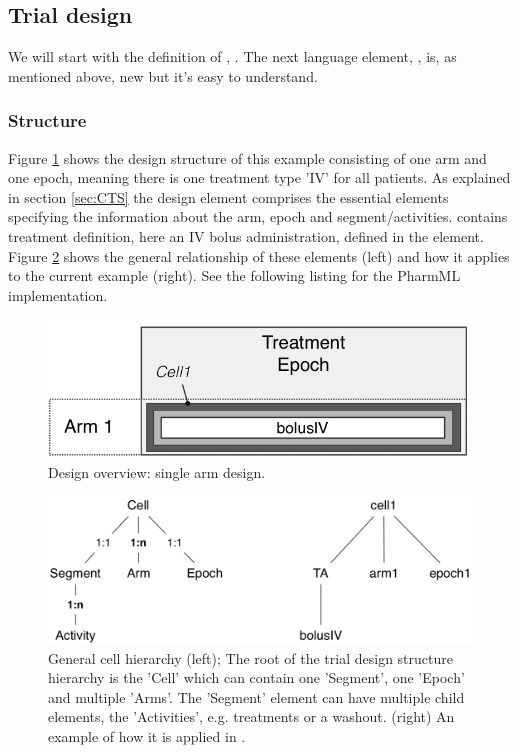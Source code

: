 \subsection{Trial design}
We will start with the definition of , . The next language element, , is, as mentioned above, new but it's easy to understand.

\subsubsection{Structure}
Figure \ref{fig:1Arm1Epoch_RibbaDesign} shows the design structure of this example 
consisting of one arm and one epoch, meaning there is one treatment type 'IV' for all patients. 
As explained in section \ref{sec:CTS} the design element  comprises the 
essential elements specifying the information about the arm, epoch and segment/activities. 
 contains treatment definition, here an IV bolus administration, 
defined in the  element. Figure \ref{fig:cellHierarchy_Ribba} shows 
the general relationship of these elements (left) and how it applies to the current example (right).
See the following listing 
for the PharmML implementation.

\begin{figure}[ht!]
\centering
\includegraphics[width=0.7\linewidth]{pics/designPattern_1Arm1Epoch_Ribba}
\caption{Design overview: single arm design.}
\label{fig:1Arm1Epoch_RibbaDesign}
\end{figure}

\begin{figure}[ht!]
\centering
\includegraphics[width=0.7\linewidth]{pics/cellHierarchy_Ribba}
\caption{General cell hierarchy (left); The root of the trial design structure hierarchy is the 'Cell' which can contain one 'Segment',
one 'Epoch' and multiple 'Arms'. The 'Segment' element can have multiple child elements, the 'Activities', e.g. treatments or a washout. (right) An example of how it is applied in \cite{Ribba:2012uq}.}
\label{fig:cellHierarchy_Ribba}
\end{figure}

